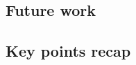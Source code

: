 \documentclass{beamer}
\begin{document}
	\subsection{Future work}
	
	\subsection{Key points recap}
	

	

	

	
\end{document}
